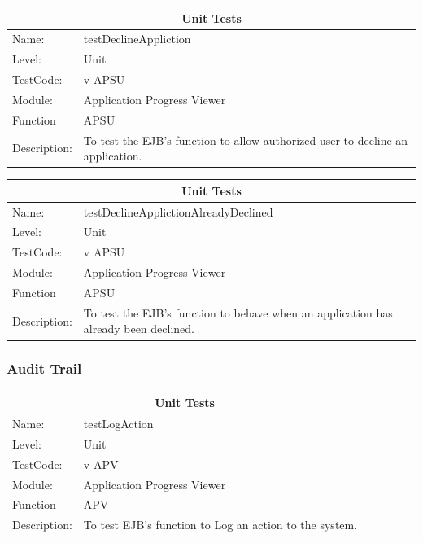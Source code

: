 \documentclass[12pt]{article}
\begin{document}
\begin{center}
\begin{tabular}{|l|p{12cm}|}
\hline
\multicolumn{2}{|c|}{\bf Unit Tests} \\
\hline
 Name: & testDeclineAppliction  \\
\hline
Level: & Unit \\
\hline
TestCode: & v APSU \\
\hline
Module:& Application Progress Viewer \\
\hline
Function & APSU \\
\hline
Description: & To test the EJB's function to allow authorized user to decline an application. \\
\hline
\end{tabular}
\end{center}

\begin{center}
\begin{tabular}{|l|p{12cm}|}
\hline
\multicolumn{2}{|c|}{\bf Unit Tests} \\
\hline
 Name: & testDeclineApplictionAlreadyDeclined  \\
\hline
Level: & Unit \\
\hline
TestCode: & v APSU \\
\hline
Module:& Application Progress Viewer \\
\hline
Function & APSU \\
\hline
Description: & To test the EJB's function to behave when an application has already been declined. \\
\hline
\end{tabular}
\end{center}


\subsubsection{Audit Trail}

\begin{center}
\begin{tabular}{|l|p{12cm}|}
\hline
\multicolumn{2}{|c|}{\bf Unit Tests} \\
\hline
 Name: & testLogAction  \\
\hline
Level: & Unit \\
\hline
TestCode: & v APV \\
\hline
Module:& Application Progress Viewer \\
\hline
Function & APV \\
\hline
Description: & To test EJB's function to Log an action to the system. \\
\hline
\end{tabular}
\end{center}
\end{document}

